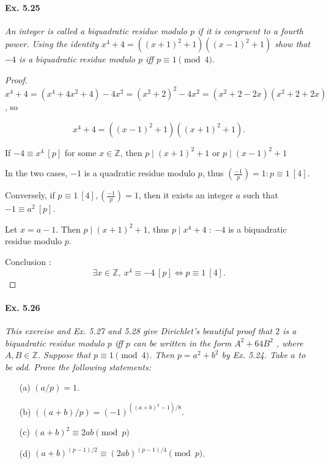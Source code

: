 \documentclass[11pt,a4paper]{article}
\newcommand{\Z}{\mathbb{Z}}
\newcommand{\legendre}[2]{\genfrac{(}{)}{}{}{#1}{#2}}
\begin{document}
\paragraph{Ex. 5.25}

{\it An integer is called a biquadratic residue modulo $p$ if it is congruent to a fourth power. Using the identity $x^4 + 4 = ((x + 1)^2 + 1)((x - 1)^2 + 1)$ show that $-4$ is a biquadratic residue modulo $p$ iff $p \equiv 1 \pmod 4$.
}

\begin{proof}
 
 $x^4+4 = (x^4 + 4 x^2 + 4) - 4 x^2 = (x^2+2)^2 - 4x^2 = (x^2 + 2 -2x)(x^2+2+2x) $, so
 
 $$x^4+4 = ((x-1)^2+1)((x+1)^2+1).$$
 
 If $-4 \equiv x^4\  [p]$ for some $x \in \Z$, then $p \mid (x+1)^2 + 1$ or $p \mid (x-1)^2+1$
 
In the two cases, $-1$ is a quadratic residue modulo $p$, thus $\legendre{-1}{p} = 1 : p \equiv 1\  [4]$.
 

 
 Conversely, if $p\equiv 1\ [4], \legendre{-1}{p} = 1 $, then it exists an integer $a$ such that $-1 \equiv a^2 \ [p]$.
 
Let  $x = a-1$. Then $p \mid (x+1)^2 +1$, thus $p \mid x^4+4$ : $-4$ is a biquadratic residue modulo $p$.
 
 Conclusion : $$\exists x \in \mathbb{Z},\  x^4 \equiv -4 \ [p] \iff p \equiv 1\ [4].$$
\end{proof}

\paragraph{Ex. 5.26}

{\it This exercise and Ex. 5.27 and 5.28 give Dirichlet's beautiful proof that $2$ is a biquadratic residue modulo $p$ iff $p$ can be written in the form $A^2 + 64B^2$ , where $A, B \in \Z$. Suppose that $p \equiv 1 \pmod 4$. Then $p = a^2 + b^2$ by Ex. 5.24. Take $a$ to be odd.  Prove the following statements:

\begin{enumerate}
\item[(a)]$(a/p) = 1$.
\item[(b)] $((a + b)/p) = (-1)^{((a+b)^2 -1)/8}$.
\item [(c)] $(a + b)^2 \equiv 2ab \pmod p$
\item[(d)] $(a + b)^{(p- 1)/2} \equiv (2ab)^{(p- 1)/4} \pmod p$.
\end{enumerate}
}
\end{document}
